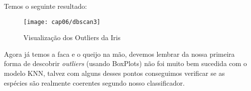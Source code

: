 Temos o seguinte resultado:
\begin{figure}[H]
	\centering
	\texttt{[image: cap06/dbscan3]}
	\caption{Visualização dos Outliers da Iris}
\end{figure}

Agora já temos a faca e o queijo na mão, devemos lembrar da nossa primeira forma de descobrir \textit{outliers} (usando BoxPlots) não foi muito bem sucedida com o modelo KNN, talvez com alguns desses pontos conseguimos verificar se as espécies são realmente coerentes segundo nosso classificador.

\clearpage
